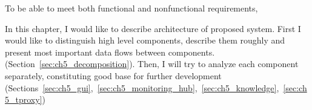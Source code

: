 To be able to meet both functional and nonfunctional requirements, 


In this chapter, I would like to describe architecture of proposed system. First I would like to distinguish high level
components, describe them roughly and present most important data flows between components.
(Section~\ref{sec:ch5_decomposition}). Then, I will try to analyze each component separately, constituting good base
for further development
(Sections~\ref{sec:ch5_gui},~\ref{sec:ch5_monitoring_hub},~\ref{sec:ch5_knowledge},~\ref{sec:ch5_tproxy})












